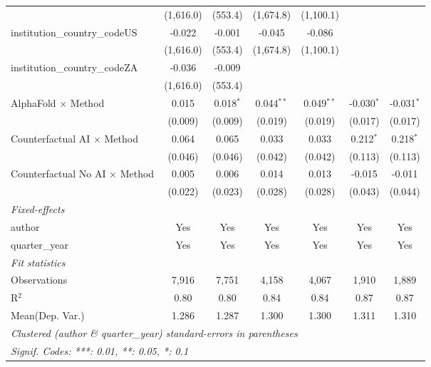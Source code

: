 \begin{tabular}{lcccccc}
                                         & (1,616.0)      & (553.4)        & (1,674.8)     & (1,100.1)     &              &   \\   
   institution\_country\_codeUS          & -0.022         & -0.001         & -0.045        & -0.086        &              &   \\   
                                         & (1,616.0)      & (553.4)        & (1,674.8)     & (1,100.1)     &              &   \\   
   institution\_country\_codeZA          & -0.036         & -0.009         &               &               &              &   \\   
                                         & (1,616.0)      & (553.4)        &               &               &              &   \\   
   AlphaFold $\times$ Method             & 0.015          & 0.018$^{*}$    & 0.044$^{**}$  & 0.049$^{**}$  & -0.030$^{*}$ & -0.031$^{*}$\\   
                                         & (0.009)        & (0.009)        & (0.019)       & (0.019)       & (0.017)      & (0.017)\\   
   Counterfactual AI $\times$ Method     & 0.064          & 0.065          & 0.033         & 0.033         & 0.212$^{*}$  & 0.218$^{*}$\\   
                                         & (0.046)        & (0.046)        & (0.042)       & (0.042)       & (0.113)      & (0.113)\\   
   Counterfactual No AI $\times$ Method  & 0.005          & 0.006          & 0.014         & 0.013         & -0.015       & -0.011\\   
                                         & (0.022)        & (0.023)        & (0.028)       & (0.028)       & (0.043)      & (0.044)\\   
   \midrule
   \emph{Fixed-effects}\\
   author                                & Yes            & Yes            & Yes           & Yes           & Yes          & Yes\\  
   quarter\_year                         & Yes            & Yes            & Yes           & Yes           & Yes          & Yes\\  
   \midrule
   \emph{Fit statistics}\\
   Observations                          & 7,916          & 7,751          & 4,158         & 4,067         & 1,910        & 1,889\\  
   R$^2$                                 & 0.80           & 0.80           & 0.84          & 0.84          & 0.87         & 0.87\\  
Mean(Dep. Var.) & 1.286 & 1.287 & 1.300 & 1.300 & 1.311 & 1.310 \\
   \midrule \midrule
   \multicolumn{7}{l}{\emph{Clustered (author \& quarter\_year) standard-errors in parentheses}}\\
   \multicolumn{7}{l}{\emph{Signif. Codes: ***: 0.01, **: 0.05, *: 0.1}}\\
\end{tabular}
\par\endgroup
